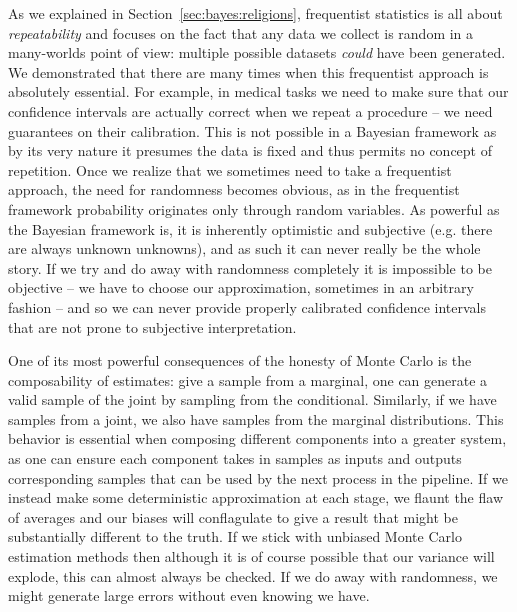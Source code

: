As we explained in Section~\ref{sec:bayes:religions},
frequentist statistics is all about \emph{repeatability} and focuses on the fact that any data we collect is random
in a many-worlds point of view: multiple possible
datasets \emph{could} have been generated.  We demonstrated that there are many times when this frequentist
approach is absolutely essential.  For example, in medical tasks we need
to make sure that our confidence intervals are actually correct when we repeat a procedure -- we need guarantees on
their calibration.  This is not possible in a Bayesian framework as by its very nature it presumes the data
is fixed and thus permits no concept of repetition.  Once we realize that we sometimes need to take a frequentist
approach, the need for randomness becomes obvious, as in the frequentist framework probability originates only
through random variables.  As powerful as the Bayesian framework is, it is inherently optimistic and subjective
(e.g. there are always unknown unknowns), and as such it can never really be the whole story.  If we try and
do away with randomness completely it is impossible to be objective -- we have to choose our approximation, sometimes
in an arbitrary fashion -- and so we can never provide properly calibrated confidence 
intervals that are not prone to subjective interpretation.

One of its most powerful consequences of the honesty of Monte Carlo is the composability
of estimates: give a sample from a marginal, one can generate a valid sample of the joint by sampling from the
conditional.  Similarly, if we have samples from a joint, we also have samples from the marginal distributions.  This behavior
is essential when composing different components into a greater system, as one can ensure each component takes in
samples as inputs and outputs corresponding samples that can be used by the next process in the pipeline.
If we instead make some deterministic approximation at each stage, we flaunt the flaw of averages and our biases
will conflagulate to give a result that might be substantially different to the truth.  If we stick with unbiased Monte Carlo estimation
methods then although it is of course possible that our variance will explode, this can almost always be checked.
If we do away with randomness, we might generate large errors without even knowing we have.

